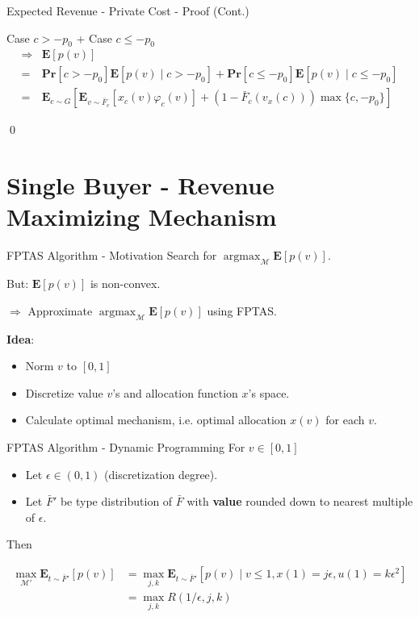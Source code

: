 \documentclass{beamer}
\begin{document}
\begin{frame}{Expected Revenue - Private Cost - Proof (Cont.)}

  Case $c > -p_0$ + Case $c \leq -p_0$
  \begin{align*}
    \Rightarrow & \mathbf{E}\left[p(v)\right]                                                                                                            \\
    =           & \mathbf{Pr}[c > -p_0]\mathbf{E}\left[p(v) \mid c > -p_0\right] + \mathbf{Pr}[c \leq -p_0]\mathbf{E}\left[p(v) \mid c \leq -p_0\right]  \\
    =           & \mathbf{E}_{c \sim G}\left[\mathbf{E}_{v \sim \bar{F}_c}\left[x_c(v)\varphi_c(v)\right] + (1-\bar{F}_c(v_x(c))) \max\{c, -p_0\}\right]
  \end{align*}

  \qed
\end{frame}

\section{Single Buyer - Revenue Maximizing Mechanism}

\begin{frame}{FPTAS Algorithm - Motivation}
  Search for $\operatorname{argmax}_{\mathcal{M}} \mathbf{E}\left[p(v)\right]$.

  But: $\mathbf{E}\left[p(v)\right]$ is non-convex.

  $\Rightarrow$ Approximate $\operatorname{argmax}_{\mathcal{M}} \mathbf{E}\left[p(v)\right]$ using FPTAS.

  \textbf{Idea}:
  \begin{itemize}
    \item Norm $v$ to $[0,1]$
    \item Discretize value $v$'s and allocation function $x$'s space.
    \item Calculate optimal mechanism, i.e. optimal allocation $x(v)$ for each $v$.
  \end{itemize}

\end{frame}

\begin{frame}{FPTAS Algorithm - Dynamic Programming}
  For $v \in [0,1]$
  \begin{itemize}
    \item Let $\epsilon \in (0,1)$ (discretization degree).
    \item Let $\bar{F}'$ be type distribution of $\bar{F}$ with \textbf{value} rounded down to nearest multiple of $\epsilon$.
  \end{itemize}

  Then

  \begin{align*}
    \max_{\mathcal{M}'} \mathbf{E}_{t \sim \bar{F}'}\left[p(v)\right] & = \max_{j, k} \mathbf{E}_{t \sim \bar{F}'}\left[p(v) \mid v \leq 1, x(1) = j\epsilon, u(1) = k \epsilon^2\right] \\
                                                                      & = \max_{j, k} R(1 / \epsilon, j, k)
  \end{align*}
\end{frame}
\end{document}
